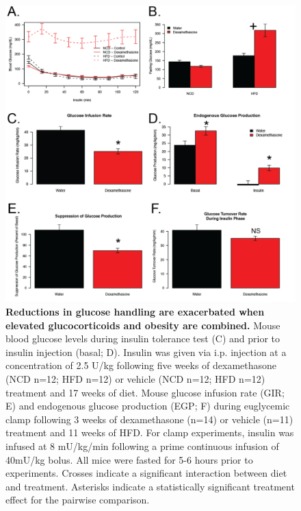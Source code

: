 \documentclass[11pt]{article} %
\begin{document}
\begin{figure}
  \begin{center}
    \includegraphics[width=\textwidth]{Figures_Figure_1.png}
  \end{center}
  \caption{\textbf{Reductions in glucose handling are exacerbated when
elevated glucocorticoids and obesity are combined. } Mouse blood glucose levels during insulin tolerance test (C) and prior
to insulin injection (basal; D). Insulin was given via i.p. injection at
a concentration of 2.5 U/kg following five weeks of dexamethasone (NCD
n=12; HFD n=12) or vehicle (NCD n=12; HFD n=12) treatment and 17 weeks
of diet. Mouse glucose infusion rate (GIR; E) and endogenous glucose
production (EGP; F) during euglycemic clamp following 3 weeks of
dexamethasone (n=14) or vehicle (n=11) treatment and 11 weeks of HFD.
For clamp experiments, insulin was infused at 8 mU/kg/min following a
prime continuous infusion of 40mU/kg bolus. All mice were fasted for 5-6
hours prior to experiments. Crosses indicate a significant interaction
between diet and treatment. Asterisks indicate a statistically
significant treatment effect for the pairwise comparison.}
 \label{fig:1}
\end{figure}
\end{document}
